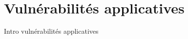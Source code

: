 

\chapter{Vulnérabilités applicatives}\label{vulnerabilites:applicatives}

Intro vulnérabilités applicatives



\endinput
